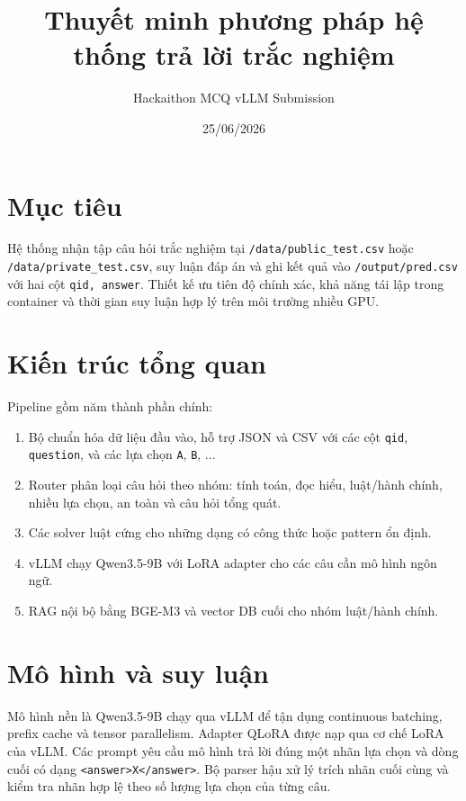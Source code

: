 \documentclass[12pt,a4paper]{article}
\title{Thuyết minh phương pháp hệ thống trả lời trắc nghiệm}
\author{Hackaithon MCQ vLLM Submission}
\date{25/06/2026}
\begin{document}
\maketitle

\section{Mục tiêu}

Hệ thống nhận tập câu hỏi trắc nghiệm tại \texttt{/data/public\_test.csv}
hoặc \texttt{/data/private\_test.csv}, suy luận đáp án và ghi kết quả vào
\texttt{/output/pred.csv} với hai cột \texttt{qid, answer}. Thiết kế ưu tiên
độ chính xác, khả năng tái lập trong container và thời gian suy luận hợp lý
trên môi trường nhiều GPU.

\section{Kiến trúc tổng quan}

Pipeline gồm năm thành phần chính:

\begin{enumerate}[leftmargin=*]
  \item Bộ chuẩn hóa dữ liệu đầu vào, hỗ trợ JSON và CSV với các cột
  \texttt{qid}, \texttt{question}, và các lựa chọn \texttt{A}, \texttt{B}, ...
  \item Router phân loại câu hỏi theo nhóm: tính toán, đọc hiểu, luật/hành
  chính, nhiều lựa chọn, an toàn và câu hỏi tổng quát.
  \item Các solver luật cứng cho những dạng có công thức hoặc pattern ổn định.
  \item vLLM chạy Qwen3.5-9B với LoRA adapter cho các câu cần mô hình ngôn ngữ.
  \item RAG nội bộ bằng BGE-M3 và vector DB cuối cho nhóm luật/hành chính.
\end{enumerate}

\section{Mô hình và suy luận}

Mô hình nền là Qwen3.5-9B chạy qua vLLM để tận dụng continuous batching,
prefix cache và tensor parallelism. Adapter QLoRA được nạp qua cơ chế LoRA của
vLLM. Các prompt yêu cầu mô hình trả lời đúng một nhãn lựa chọn và dòng cuối có
dạng \texttt{<answer>X</answer>}. Bộ parser hậu xử lý trích nhãn cuối cùng và
kiểm tra nhãn hợp lệ theo số lượng lựa chọn của từng câu.
\end{document}
